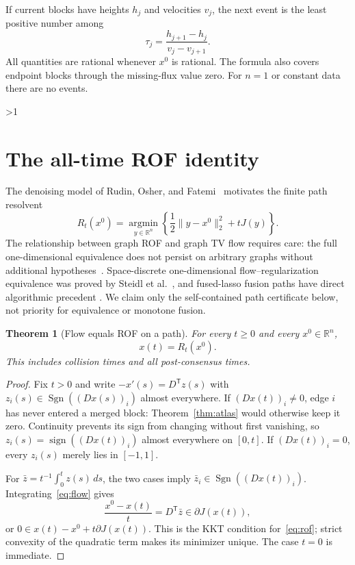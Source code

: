 \documentclass[10pt]{article}
\providecommand{\CRevisionRound}{2}
\newtheorem{theorem}{Theorem}
\newcommand{\R}{\mathbb{R}}
\newcommand{\Sgn}{\operatorname{Sgn}}
\begin{document}
If current blocks have heights $h_j$ and velocities $v_j$, the next event is
the least positive number among
\[
 \tau_j=\frac{h_{j+1}-h_j}{v_j-v_{j+1}}.
\]
All quantities are rational whenever $x^0$ is rational.  The formula also
covers endpoint blocks through the missing-flux value zero.  For $n=1$ or
constant data there are no events.
\fi

\ifnum\CRevisionRound>1
\section{The all-time ROF identity}
The denoising model of Rudin, Osher, and Fatemi~\cite{ROF1992} motivates the
finite path resolvent
\begin{equation}\label{eq:rof}
 R_t(x^0)=\underset{y\in\R^n}{\operatorname{argmin}}
 \left\{\frac12\lVert y-x^0\rVert_2^2+tJ(y)\right\}.
\end{equation}
The relationship between graph ROF and graph TV flow requires care: the full
one-dimensional equivalence does not persist on arbitrary graphs without
additional hypotheses~\cite{KSS2019}.  Space-discrete one-dimensional
flow--regularization equivalence was proved by Steidl et al.~\cite{Steidl2004},
and fused-lasso fusion paths have direct algorithmic precedent
\cite{Hoefling2010}.  We claim only the self-contained path certificate below,
not priority for equivalence or monotone fusion.

\begin{theorem}[Flow equals ROF on a path]\label{thm:rof}
For every $t\geq0$ and every $x^0\in\R^n$,
\[
 x(t)=R_t(x^0).
\]
This includes collision times and all post-consensus times.
\end{theorem}
\begin{proof}
Fix $t>0$ and write $-x'(s)=D^{\mathsf T}z(s)$ with
$z_i(s)\in\Sgn((Dx(s))_i)$ almost everywhere.  If $(Dx(t))_i\ne0$, edge $i$
has never entered a merged block: Theorem~\ref{thm:atlas} would otherwise keep
it zero.  Continuity prevents its sign from changing without first vanishing,
so $z_i(s)=\operatorname{sign}((Dx(t))_i)$ almost everywhere on $[0,t]$.
If $(Dx(t))_i=0$, every $z_i(s)$ merely lies in $[-1,1]$.

For $\bar z=t^{-1}\int_0^t z(s)\,ds$, the two cases imply
$\bar z_i\in\Sgn((Dx(t))_i)$.  Integrating~\eqref{eq:flow} gives
\[
 \frac{x^0-x(t)}{t}=D^{\mathsf T}\bar z\in\partial J(x(t)),
\]
or $0\in x(t)-x^0+t\partial J(x(t))$.  This is the KKT condition
for~\eqref{eq:rof}; strict convexity of the quadratic term makes its minimizer
unique.  The case $t=0$ is immediate.
\end{proof}
\end{document}
